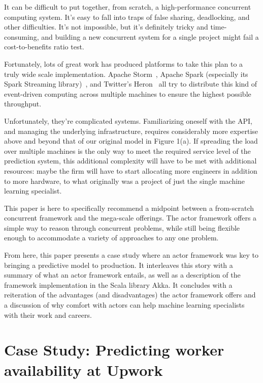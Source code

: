 \documentclass[tablecaption=bottom,wcp]{jmlr}
\begin{document}
 It can be difficult to put together, from scratch, a high-performance
concurrent computing system. It's easy to fall into traps of false sharing,
deadlocking, and other difficulties. It's not impossible, but it's definitely
tricky and time-consuming, and building a new concurrent system for a single
project might fail a cost-to-benefits ratio test.

 Fortunately, lots of great work has produced platforms to take this plan to a
truly wide scale implementation. Apache Storm~\cite{apache_storm}, 
Apache Spark (especially its Spark Streaming library)~\cite{apache_spark}, 
and Twitter's Heron~\cite{kulkarni2015heron} all try to distribute this kind of 
event-driven computing across multiple machines to ensure the highest 
possible throughput.

 Unfortunately, they're complicated systems. Familiarizing oneself with the API,
and managing the underlying infrastructure, requires considerably more expertise
above and beyond that of our original model in Figure 1(a). If spreading the
load over multiple machines is the only way to meet the required service level
of the prediction system, this additional complexity will have to be met with
additional resources: maybe the firm will have to start allocating more
engineers in addition to more hardware, to what originally was a project of just
the single machine learning specialist.

 This paper is here to specifically recommend a midpoint between a from-scratch
concurrent framework and the mega-scale offerings. The actor framework offers a
simple way to reason through concurrent problems, while still being flexible
enough to accommodate a variety of approaches to any one problem.

 From here, this paper presents a case study where an actor framework was key to
bringing a predictive model to production. It interleaves this story with a
summary of what an actor framework entails, as well as a description of the
framework implementation in the Scala library Akka. It concludes with a reiteration
of the advantages (and disadvantages) the actor framework offers and a
discussion of why comfort with actors can help machine learning specialists with
their work and careers.

\section{Case Study: Predicting worker availability at Upwork}
\end{document}
